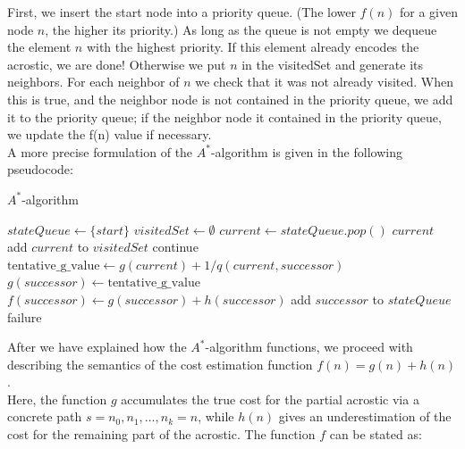 \documentclass[11pt]{reportAlternative}
\begin{document}
First, we insert the start node into a priority queue. (The lower $f(n)$ for a given node $n$, the higher its priority.) As long as the queue is not empty we dequeue the element $n$ with the highest priority. If this element already encodes the acrostic, we are done! Otherwise we put $n$ in the
visitedSet and generate its neighbors. For each neighbor of $n$ we check that it was not already visited. When this is true, and the neighbor node is not contained in the priority queue, we add it to the priority queue; if the neighbor node it contained in the priority queue, we update the f(n) value if necessary.\\

A more precise formulation of the $A^*$-algorithm is given in the following pseudocode:\\

\newpage
\begin{algorithm}
\caption{$A^*$-algorithm}\label{Astar}
\begin{algorithmic}[1]
\State $stateQueue\gets \{start\}$
\State $visitedSet\gets \emptyset$
\State $current\gets stateQueue.pop()$
\State \Return $current$ 
\EndIf
\State add $current$ to $visitedSet$
			 \State continue
		\EndIf		
		\State
		\State $\textrm{tentative\_g\_value} \gets g(current) + 1/q(current,successor)$		
		\State
			\State $g(successor)\gets \mathrm{tentative\_g\_value}$
			\State $f(successor)\gets g(successor) + h(successor)$
				\State add $successor$ to $stateQueue$
			\EndIf
		\EndIf
	\EndFor			
\EndWhile			 
\Return failure
\EndFunction
\end{algorithmic}
\end{algorithm}


After we have explained how the $A^*$-algorithm functions, we proceed with describing the semantics of the cost estimation function $f(n)=g(n) + h(n)$.\\
Here, the function $g$ accumulates the true cost for the partial acrostic via a concrete path $s=n_0,n_1,\dots,n_k=n$, while $h(n)$ gives an underestimation of the cost for the remaining part of the acrostic. The function $f$ can be stated as:
  
\end{document}
